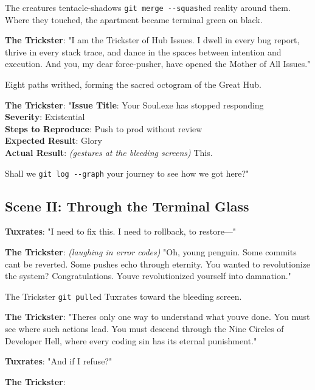 The creature\textquotesingle s tentacle-shadows \texttt{git\ merge\ -\/-squash}ed reality around them. Where they touched, the apartment became terminal green on black.

\textbf{The Trickster}: "I am the Trickster of Hub Issues. I dwell in every bug report, thrive in every stack trace, and dance in the spaces between intention and execution. And you, my dear force-pusher, have opened the Mother of All Issues."

Eight paths writhed, forming the sacred octogram of the Great Hub.

\textbf{The Trickster}: "\textbf{Issue Title}: Your Soul.exe has stopped responding\\
\textbf{Severity}: Existential\\
\textbf{Steps to Reproduce}: Push to prod without review\\
\textbf{Expected Result}: Glory\\
\textbf{Actual Result}: \emph{(gestures at the bleeding screens)} This.

Shall we \texttt{git\ log\ -\/-graph} your journey to see how we got here?"

\bookdivider

\subsection{Scene II: Through the Terminal Glass}\label{scene-ii-through-the-terminal-glass}

\textbf{Tuxrates}: "I need to fix this. I need to rollback, to restore---"

\textbf{The Trickster}: \emph{(laughing in error codes)} "Oh, young penguin. Some commits can\textquotesingle t be reverted. Some pushes echo through eternity. You wanted to revolutionize the system? Congratulations. You\textquotesingle ve revolutionized yourself into damnation."

The Trickster \texttt{git\ pull}ed Tuxrates toward the bleeding screen.

\textbf{The Trickster}: "There\textquotesingle s only one way to understand what you\textquotesingle ve done. You must see where such actions lead. You must descend through the Nine Circles of Developer Hell, where every coding sin has its eternal punishment."

\textbf{Tuxrates}: "And if I refuse?"

\textbf{The Trickster}:


